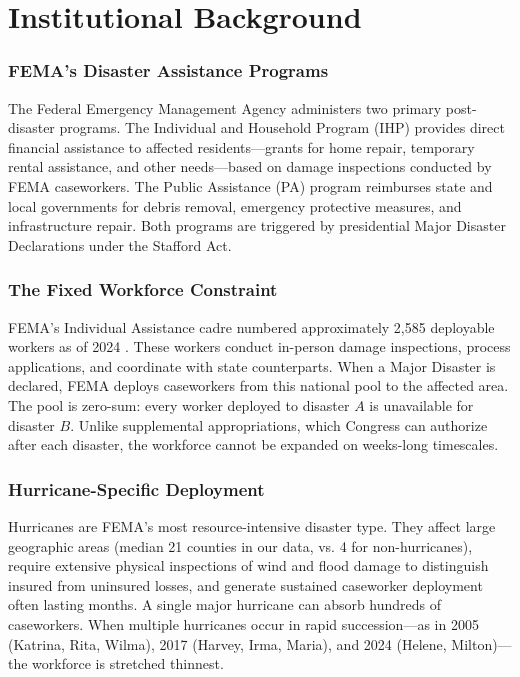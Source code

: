 \documentclass[12pt]{article}
\begin{document}
\section{Institutional Background}

\subsubsection*{FEMA's Disaster Assistance Programs} The Federal Emergency Management Agency administers two primary post-disaster programs. The Individual and Household Program (IHP) provides direct financial assistance to affected residents---grants for home repair, temporary rental assistance, and other needs---based on damage inspections conducted by FEMA caseworkers. The Public Assistance (PA) program reimburses state and local governments for debris removal, emergency protective measures, and infrastructure repair. Both programs are triggered by presidential Major Disaster Declarations under the Stafford Act.

\subsubsection*{The Fixed Workforce Constraint} FEMA's Individual Assistance cadre numbered approximately 2,585 deployable workers as of 2024 \citep{gao2025}. These workers conduct in-person damage inspections, process applications, and coordinate with state counterparts. When a Major Disaster is declared, FEMA deploys caseworkers from this national pool to the affected area. The pool is zero-sum: every worker deployed to disaster $A$ is unavailable for disaster $B$. Unlike supplemental appropriations, which Congress can authorize after each disaster, the workforce cannot be expanded on weeks-long timescales.

\subsubsection*{Hurricane-Specific Deployment} Hurricanes are FEMA's most resource-intensive disaster type. They affect large geographic areas (median 21 counties in our data, vs. 4 for non-hurricanes), require extensive physical inspections of wind and flood damage to distinguish insured from uninsured losses, and generate sustained caseworker deployment often lasting months. A single major hurricane can absorb hundreds of caseworkers. When multiple hurricanes occur in rapid succession---as in 2005 (Katrina, Rita, Wilma), 2017 (Harvey, Irma, Maria), and 2024 (Helene, Milton)---the workforce is stretched thinnest.
\end{document}
